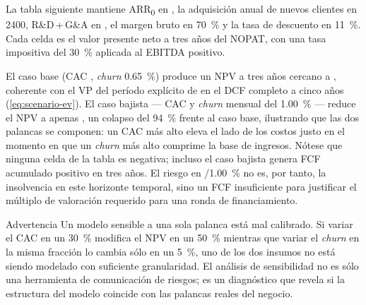 \begin{example}
La tabla siguiente mantiene ARR\textsubscript{0} en , la adquisición anual de
nuevos clientes en \num{2400}, R\&D\,+\,G\&A en , el margen bruto en
\qty{70}{\percent} y la tasa de descuento en \qty{11}{\percent}. Cada celda es el valor
presente neto a tres años del NOPAT, con una tasa impositiva del \qty{30}{\percent} aplicada
al EBITDA positivo.

\medskip
\noindent{}

\medskip
El caso base (CAC , \emph{churn} \qty{0.65}{\percent}) produce un NPV a tres años
cercano a , coherente con el VP del período explícito de  en el
DCF completo a cinco años (\cref{eq:scenario-ev}). El caso bajista --- CAC  y
\emph{churn} mensual del \qty{1.00}{\percent} --- reduce el NPV a apenas , un
colapso del \qty{94}{\percent} frente al caso base, ilustrando que las dos palancas se
componen: un CAC más alto eleva el lado de los costos justo en el momento en que un
\emph{churn} más alto comprime la base de ingresos. Nótese que ninguna celda de la tabla es
negativa; incluso el caso bajista genera FCF acumulado positivo en tres años. El riesgo en
/\qty{1.00}{\percent} no es, por tanto, la insolvencia en este horizonte temporal,
sino un FCF insuficiente para justificar el múltiplo de valoración requerido para una ronda de
financiamiento.
\end{example}

\begin{admonition}{Advertencia}
Un modelo sensible a una sola palanca está mal calibrado. Si variar el CAC en un \qty{30}{\percent}
modifica el NPV en un \qty{50}{\percent} mientras que variar el \emph{churn} en la misma fracción
lo cambia sólo en un \qty{5}{\percent}, uno de los dos insumos no está siendo modelado con
suficiente granularidad. El análisis de sensibilidad no es sólo una herramienta de comunicación
de riesgos; es un diagnóstico que revela si la estructura del modelo coincide con las palancas
reales del negocio.
\end{admonition}

